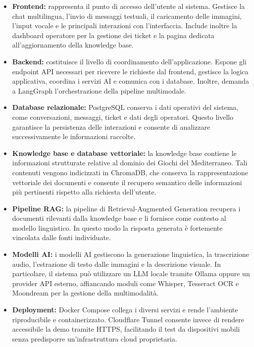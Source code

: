 \begin{itemize}

\item \textbf{Frontend:} rappresenta il punto di accesso dell’utente al sistema. Gestisce la chat multilingua, l’invio di messaggi testuali, il caricamento delle immagini, l’input vocale e le principali interazioni con l’interfaccia. Include inoltre la dashboard operatore per la gestione dei ticket e la pagina dedicata all’aggiornamento della knowledge base.

\item \textbf{Backend:} costituisce il livello di coordinamento dell’applicazione. Espone gli endpoint API necessari per ricevere le richieste dal frontend, gestisce la logica applicativa, coordina i servizi AI e comunica con i database. Inoltre, demanda a LangGraph l’orchestrazione della pipeline multimodale.

\item \textbf{Database relazionale:} PostgreSQL conserva i dati operativi del sistema, come conversazioni, messaggi, ticket e dati degli operatori. Questo livello garantisce la persistenza delle interazioni e consente di analizzare successivamente le informazioni raccolte.

\item \textbf{Knowledge base e database vettoriale:} la knowledge base contiene le informazioni strutturate relative al dominio dei Giochi del Mediterraneo. Tali contenuti vengono indicizzati in ChromaDB, che conserva la rappresentazione vettoriale dei documenti e consente il recupero semantico delle informazioni più pertinenti rispetto alla richiesta dell’utente.

\item \textbf{Pipeline RAG:} la pipeline di Retrieval-Augmented Generation recupera i documenti rilevanti dalla knowledge base e li fornisce come contesto al modello linguistico. In questo modo la risposta generata è fortemente vincolata dalle fonti individuate.

\item \textbf{Modelli AI:} i modelli AI gestiscono la generazione linguistica, la trascrizione audio, l’estrazione di testo dalle immagini e la descrizione visuale. In particolare, il sistema può utilizzare un LLM locale tramite Ollama oppure un provider API esterno, affiancando moduli come Whisper, Tesseract OCR e Moondream per la gestione della multimodalità.

\item \textbf{Deployment:} Docker Compose collega i diversi servizi e rende l’ambiente riproducibile e containerizzato. Cloudflare Tunnel consente invece di rendere accessibile la demo tramite HTTPS, facilitando il test da dispositivi mobili senza predisporre un’infrastruttura cloud proprietaria.

\end{itemize}

